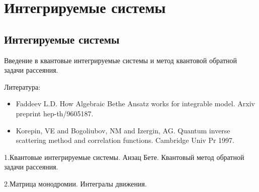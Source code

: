 \documentclass[a4paper,12pt]{article}
\theoremstyle{definition} \newtheorem{Def}{Definition}
\begin{document}
\section{Интегрируемые системы}
\label{sec:IntSys}

\subsection{Интегируемые системы}
\label{sec:-}

Введение в квантовые интегрируемые системы и метод квантовой обратной задачи рассеяния. 

Литература:
  \begin{itemize}
  \item Faddeev L.D. How Algebraic Bethe Ansatz works for integrable model. Arxiv preprint hep-th/9605187.
  \item Korepin, VE and Bogoliubov, NM and Izergin, AG. Quantum inverse scattering method and correlation functions. Cambridge Univ Pr 1997.
  \end{itemize}


1.Квантовые интегрируемые системы. Анзац Бете. Квантовый метод обратной задачи рассеяния.

2.Матрица монодромии. Интегралы движения.
{}

\end{document}
